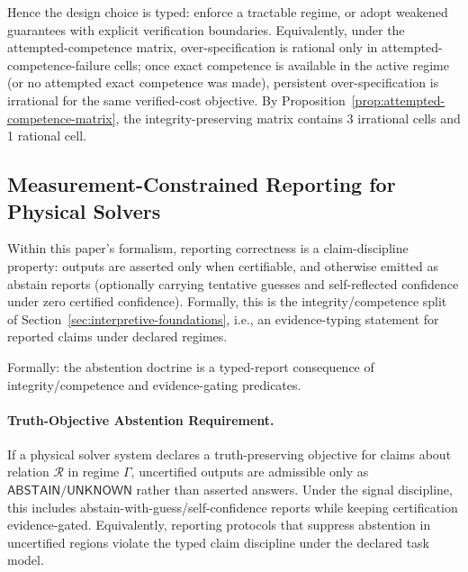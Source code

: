 Hence the design choice is typed: enforce a tractable regime, or adopt weakened guarantees with explicit verification boundaries.
Equivalently, under the attempted-competence matrix, over-specification is rational only in attempted-competence-failure cells; once exact competence is available in the active regime (or no attempted exact competence was made), persistent over-specification is irrational for the same verified-cost objective.
By Proposition~\ref{prop:attempted-competence-matrix}, the integrity-preserving matrix contains 3 irrational cells and 1 rational cell.

\subsection*{Measurement-Constrained Reporting for Physical Solvers}

Within this paper's formalism, reporting correctness is a claim-discipline property: outputs are asserted only when certifiable, and otherwise emitted as abstain reports (optionally carrying tentative guesses and self-reflected confidence under zero certified confidence).
Formally, this is the integrity/competence split of Section~\ref{sec:interpretive-foundations}, i.e., an evidence-typing statement for reported claims under declared regimes.

Formally: the abstention doctrine is a typed-report consequence of integrity/competence and evidence-gating predicates.

\paragraph{Truth-Objective Abstention Requirement.}
If a physical solver system declares a truth-preserving objective for claims about relation $\mathcal{R}$ in regime $\Gamma$, uncertified outputs are admissible only as $\mathsf{ABSTAIN}/\mathsf{UNKNOWN}$ rather than asserted answers.
Under the signal discipline, this includes abstain-with-guess/self-confidence reports while keeping certification evidence-gated.
Equivalently, reporting protocols that suppress abstention in uncertified regions violate the typed claim discipline under the declared task model.

